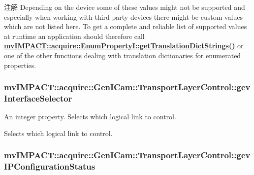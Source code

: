 \begin{DoxyNote}{注解}
Depending on the device some of these values might not be supported and especially when working with third party devices there might be custom values which are not listed here. To get a complete and reliable list of supported values at runtime an application should therefore call {\bfseries \hyperlink{classmv_i_m_p_a_c_t_1_1acquire_1_1_enum_property_i_a0ba6ccbf5ee69784d5d0b537924d26b6}{mv\+I\+M\+P\+A\+C\+T\+::acquire\+::\+Enum\+Property\+I\+::get\+Translation\+Dict\+Strings()}} or one of the other functions dealing with translation dictionaries for enumerated properties. 
\end{DoxyNote}
\hypertarget{classmv_i_m_p_a_c_t_1_1acquire_1_1_gen_i_cam_1_1_transport_layer_control_a5fcd75643ac8f2d5479bc07f6ea39bdb}{
\subsubsection[{gev\+Interface\+Selector}]{ mv\+I\+M\+P\+A\+C\+T\+::acquire\+::\+Gen\+I\+Cam\+::\+Transport\+Layer\+Control\+::gev\+Interface\+Selector}}\label{classmv_i_m_p_a_c_t_1_1acquire_1_1_gen_i_cam_1_1_transport_layer_control_a5fcd75643ac8f2d5479bc07f6ea39bdb}


An integer property. Selects which logical link to control. 

Selects which logical link to control. \hypertarget{classmv_i_m_p_a_c_t_1_1acquire_1_1_gen_i_cam_1_1_transport_layer_control_a9d9ee35e7f3ce8b03ef528c4e079c5b1}{
\subsubsection[{gev\+I\+P\+Configuration\+Status}]{ mv\+I\+M\+P\+A\+C\+T\+::acquire\+::\+Gen\+I\+Cam\+::\+Transport\+Layer\+Control\+::gev\+I\+P\+Configuration\+Status}}\label{classmv_i_m_p_a_c_t_1_1acquire_1_1_gen_i_cam_1_1_transport_layer_control_a9d9ee35e7f3ce8b03ef528c4e079c5b1}


